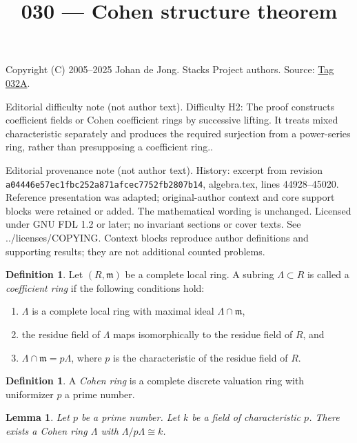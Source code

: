 \documentclass{amsart}
\theoremstyle{plain}
\newtheorem{lemma}[subsection]{Lemma}
\theoremstyle{definition}
\newtheorem{definition}[subsection]{Definition}
\theoremstyle{remark}
\numberwithin{equation}{subsection}
\begin{document}
\title[Stacks Project, Tag 032A]{030 --- Cohen structure theorem}
\maketitle
\noindent Copyright (C) 2005--2025 Johan de Jong. Stacks Project authors. Source: \href{https://stacks.math.columbia.edu/tag/032A}{Tag 032A}.

\noindent Editorial difficulty note (not author text). Difficulty H2: The proof constructs coefficient fields or Cohen coefficient rings by successive lifting. It treats mixed characteristic separately and produces the required surjection from a power-series ring, rather than presupposing a coefficient ring..

\noindent Editorial provenance note (not author text). History: excerpt from revision \texttt{a0444\allowbreak 6e57e\allowbreak c1fbc\allowbreak 252a8\allowbreak 71afc\allowbreak ec775\allowbreak 2fb28\allowbreak 07b14}, algebra.tex, lines 44928--45020. Reference presentation was adapted; original-author context and core support blocks were retained or added. The mathematical wording is unchanged. Licensed under GNU FDL 1.2 or later; no invariant sections or cover texts. See ../licenses/COPYING. Context blocks reproduce author definitions and supporting results; they are not additional counted problems.

\begin{definition}
\label{definition-coefficient-ring}
Let $(R, \mathfrak m)$ be a complete local ring.
A subring $\Lambda \subset R$ is
called a {\it coefficient ring} if the following conditions hold:
\begin{enumerate}
\item $\Lambda$ is a complete local ring with maximal ideal
$\Lambda \cap \mathfrak m$,
\item the residue field of $\Lambda$ maps isomorphically to the
residue field of $R$, and
\item $\Lambda \cap \mathfrak m = p\Lambda$, where $p$ is the characteristic
of the residue field of $R$.
\end{enumerate}
\end{definition}

\begin{definition}
\label{definition-cohen-ring}
A {\it Cohen ring} is a complete discrete valuation ring with
uniformizer $p$ a prime number.
\end{definition}

\begin{lemma}
\label{lemma-cohen-rings-exist}
Let $p$ be a prime number.
Let $k$ be a field of characteristic $p$.
There exists a Cohen ring $\Lambda$ with $\Lambda/p\Lambda \cong k$.
\end{lemma}
\end{document}
